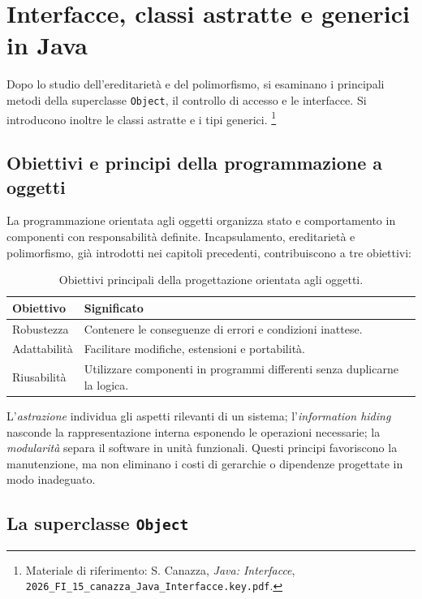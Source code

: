 \chapter{Interfacce, classi astratte e generici in Java}
\label{chap:interfacce-generici-java}

Dopo lo studio dell'ereditarietà e del polimorfismo, si
esaminano i principali metodi della superclasse \texttt{Object},
il controllo di accesso e le interfacce. Si introducono inoltre
le classi astratte e i tipi generici.%
\footnote{Materiale di riferimento: S. Canazza,
\emph{Java: Interfacce},
\nolinkurl{2026_FI_15_canazza_Java_Interfacce.key.pdf}.}

\section{Obiettivi e principi della programmazione a oggetti}
\label{sec:fi-java-interfacce-progettazione}

La programmazione orientata agli oggetti organizza stato e
comportamento in componenti con responsabilità definite.
Incapsulamento, ereditarietà e polimorfismo, già introdotti nei
capitoli precedenti, contribuiscono a tre obiettivi:

\begin{table}[htbp]
\centering
\begin{tabular}{p{2.7cm}p{9.2cm}}
\toprule
Obiettivo & Significato \\
\midrule
Robustezza & Contenere le conseguenze di errori e condizioni inattese. \\
Adattabilità & Facilitare modifiche, estensioni e portabilità. \\
Riusabilità & Utilizzare componenti in programmi differenti senza duplicarne la logica. \\
\bottomrule
\end{tabular}
\caption{Obiettivi principali della progettazione orientata agli oggetti.}
\label{tab:fi-java-interfacce-obiettivi}
\end{table}

L'\emph{astrazione} individua gli aspetti rilevanti di un sistema;
l'\emph{information hiding} nasconde la rappresentazione interna
esponendo le operazioni necessarie; la \emph{modularità} separa il
software in unità funzionali. Questi principi favoriscono la
manutenzione, ma non eliminano i costi di gerarchie o dipendenze
progettate in modo inadeguato.

\section{La superclasse \texttt{Object}}
\label{sec:fi-java-interfacce-object}

